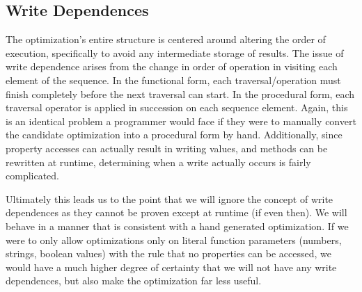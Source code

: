 \subsection{Write Dependences}

The optimization's entire structure is centered around altering the order of execution, specifically to avoid any intermediate storage of results. The issue of write dependence arises from the change in order of operation in visiting each element of the sequence.  In the functional form, each traversal/operation must finish completely before the next traversal can start.  In the procedural form, each traversal operator is applied in succession on each sequence element.  Again, this is an identical problem a programmer would face if they were to manually convert the candidate optimization into a procedural form by hand.  Additionally, since property accesses can actually result in writing values, and methods can be rewritten at runtime, determining when a write actually occurs is fairly complicated. 

Ultimately this leads us to the point that we will ignore the concept of write dependences as they cannot be proven except at runtime (if even then).  We will behave in a manner that is consistent with a hand generated optimization.  If we were to only allow optimizations only on literal function parameters (numbers, strings, boolean values) with the rule that no properties can be accessed, we would have a much higher degree of certainty that we will not have any write dependences, but also make the optimization far less useful.  